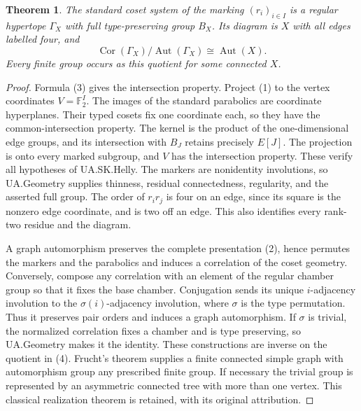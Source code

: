 \documentclass[11pt,a4paper]{article}
\newtheorem{theorem}{Theorem}
\newcommand{\F}{\mathbb F_2}
\newcommand{\Aut}{\operatorname{Aut}}
\newcommand{\Cor}{\operatorname{Cor}}
\begin{document}
\begin{theorem}
The standard coset system of the marking $(r_i)_{i\in I}$ is a regular
hypertope $\Gamma_X$ with full type-preserving group $B_X$. Its diagram
is $X$ with all edges labelled four, and
\[
 \Cor(\Gamma_X)/\Aut(\Gamma_X)\cong\Aut(X).
 \tag{4}
\]
Every finite group occurs as this quotient for some connected $X$.
\end{theorem}
\begin{proof}
Formula (3) gives the intersection property. Project (1) to the vertex
coordinates $V=\F^I$. The images of the standard parabolics are coordinate
hyperplanes. Their typed cosets fix one coordinate each, so they have the
common-intersection property. The kernel is the product of the one-dimensional
edge groups, and its intersection with $B_J$ retains precisely $E[J]$.
The projection is onto every marked subgroup, and $V$ has the intersection
property. These verify all hypotheses of UA.SK.Helly. The markers are
nonidentity involutions, so UA.Geometry supplies thinness, residual
connectedness, regularity, and the asserted full group. The order of $r_ir_j$
is four on an edge, since its square is the nonzero edge coordinate, and
is two off an edge. This also identifies every rank-two residue and the diagram.

A graph automorphism preserves the complete presentation (2), hence permutes
the markers and the parabolics and induces a correlation of the coset geometry.
Conversely, compose any correlation with an element of the regular chamber
group so that it fixes the base chamber. Conjugation sends its unique
$i$-adjacency involution to the $\sigma(i)$-adjacency involution, where
$\sigma$ is the type permutation. Thus it preserves pair orders and induces
a graph automorphism. If $\sigma$ is trivial, the normalized correlation
fixes a chamber and is type preserving, so UA.Geometry makes it the identity.
These constructions are inverse on the quotient in (4).
Frucht's theorem supplies a finite connected simple graph with automorphism
group any prescribed finite group. If necessary the trivial group is represented
by an asymmetric connected tree with more than one vertex. This classical
realization theorem is retained, with its original attribution.
\end{proof}
\end{document}
